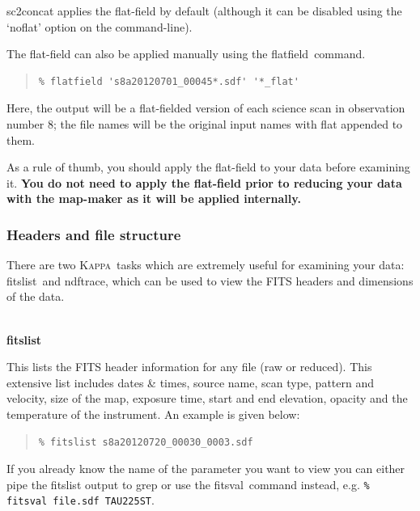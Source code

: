 \documentclass[twoside,11pt]{article}
\newcommand{\xref}[3]{#1}
\newcommand{\xlabel}[1]{}
\renewcommand{\_}{\texttt{\symbol{95}}}
\newenvironment{myquote}{\begin{quote}\begin{small}}{\end{small}\end{quote}}
\newcommand{\Kappa}{\xref{\textsc{Kappa}}{sun95}{}}
\newcommand{\task}[1]{\textsf{#1}}
\newcommand{\flatfield}{\xref{\task{flatfield}}{sun258}{FLATFIELD}}
\newcommand{\fitslist}{\xref{\task{fitslist}}{sun95}{FITSLIST}}
\newcommand{\fitsval}{\xref{\task{fitsval}}{sun95}{FITSVAL}}
\newcommand{\ndftrace}{\xref{\task{ndftrace}}{sun95}{NDFTRACE}}
\begin{document}
\task{sc2concat} applies the flat-field by default (although it can be
disabled using the `noflat' option on the command-line).

The flat-field can also be applied manually using the \flatfield\ command.

\begin{myquote}
\begin{verbatim}
% flatfield 's8a20120701_00045*.sdf' '*_flat'
\end{verbatim}
\end{myquote}
Here, the output will be a flat-fielded version of each science scan
in observation number 8; the file names will be the original input
names with \_flat appended to them.

As a rule of thumb, you should apply the flat-field to your data
before examining it. \textbf{You do not need to apply the flat-field
prior to reducing your data with the map-maker as it will be applied
internally.}


\subsubsection{\xlabel{header}Headers and file structure}
\label{sec:fitsheader}

There are two \Kappa\ tasks which are extremely useful for examining
your data: \fitslist\ and \ndftrace, which can be used to view the
FITS headers and dimensions of the data.
\\ \\
\begin{minipage}[t]{0.12\linewidth}
\textbf{fitslist}
\end{minipage}
\begin{minipage}[t]{0.85\linewidth}This lists the FITS header information
for any file (raw or reduced). This extensive list includes dates \& times,
source name, scan type, pattern and velocity, size of the map, exposure
time, start and end elevation, opacity and the temperature of the
instrument. An example is given below:
\begin{myquote}
\begin{verbatim}
% fitslist s8a20120720_00030_0003.sdf
\end{verbatim}
\end{myquote}
If you already know the name of the parameter you want to view you can
either pipe the \task{fitslist} output to grep or use the \fitsval\ command
instead, e.g. \texttt{\% fitsval file.sdf TAU225ST}.\\
\end{minipage}
\end{document}
